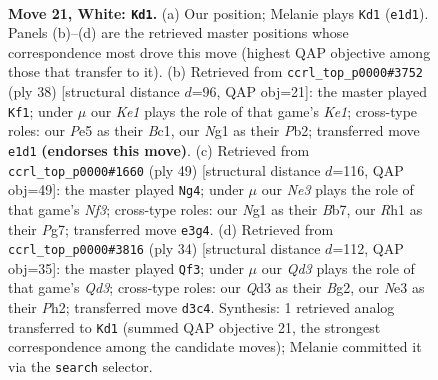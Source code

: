 \documentclass[11pt]{article}
\begin{document}
\clearpage

\begin{figure}[p]\centering
\begin{subfigure}{0.46\textwidth}\centering
\resizebox{\linewidth}{!}{%
\newchessgame
\chessboard[
  setfen={r1b2k2/ppq2pp1/n3p3/3pP3/3n1r2/PP1QN3/6PP/R3K1NR w KQ - 2 21},
  showmover=false,
  pgfstyle=straightmove, color=movearrow, markmove={e1-d1}
]}
\caption{}
\end{subfigure}\hfill
\begin{subfigure}{0.46\textwidth}\centering
\resizebox{\linewidth}{!}{%
\newchessgame
\chessboard[
  setfen={r3kn1r/4p3/p1ppq2p/5p2/P2Q2nP/6N1/1PP2PP1/R1B1K2R w KQkq - 1 20},
  showmover=false,
  pgfstyle=straightmove, color=movearrow, markmove={e1-f1}
]}
\caption{}
\end{subfigure}
\\[4pt]
\begin{subfigure}{0.46\textwidth}\centering
\resizebox{\linewidth}{!}{%
\newchessgame
\chessboard[
  setfen={2k4r/1b4p1/p1p1pn2/1p5p/3qPP2/P1N2BP1/1PQ3P1/4RK2 b - - 1 25},
  showmover=false,
  pgfstyle=straightmove, color=movearrow, markmove={f6-g4}
]}
\caption{}
\end{subfigure}\hfill
\begin{subfigure}{0.46\textwidth}\centering
\resizebox{\linewidth}{!}{%
\newchessgame
\chessboard[
  setfen={r1b3k1/2p3pp/2p2r2/2Np1p1q/p2PnP2/3Q4/PP2PPBP/2R1R1K1 w - - 2 18},
  showmover=false,
  pgfstyle=straightmove, color=movearrow, markmove={d3-f3}
]}
\caption{}
\end{subfigure}
\caption{\textbf{Move 21, White: \texttt{Kd1}.} (a) Our position; Melanie plays \texttt{Kd1} (\texttt{e1d1}). Panels (b)--(d) are the retrieved master positions whose correspondence most drove this move (highest QAP objective among those that transfer to it). (b) Retrieved from \texttt{ccrl\_top\_p0000\#3752} (ply 38) [structural distance $d$=96, QAP obj=21]: the master played \texttt{Kf1}; under $\mu$ our \emph{Ke1} plays the role of that game's \emph{Ke1}; cross-type roles: our \emph{P}e5 as their \emph{B}c1, our \emph{N}g1 as their \emph{P}b2; transferred move \texttt{e1d1} \textbf{(endorses this move)}. (c) Retrieved from \texttt{ccrl\_top\_p0000\#1660} (ply 49) [structural distance $d$=116, QAP obj=49]: the master played \texttt{Ng4}; under $\mu$ our \emph{Ne3} plays the role of that game's \emph{Nf3}; cross-type roles: our \emph{N}g1 as their \emph{B}b7, our \emph{R}h1 as their \emph{P}g7; transferred move \texttt{e3g4}. (d) Retrieved from \texttt{ccrl\_top\_p0000\#3816} (ply 34) [structural distance $d$=112, QAP obj=35]: the master played \texttt{Qf3}; under $\mu$ our \emph{Qd3} plays the role of that game's \emph{Qd3}; cross-type roles: our \emph{Q}d3 as their \emph{B}g2, our \emph{N}e3 as their \emph{P}h2; transferred move \texttt{d3c4}. Synthesis: 1 retrieved analog transferred to \texttt{Kd1} (summed QAP objective 21, the strongest correspondence among the candidate moves); Melanie committed it via the \texttt{search} selector.}
\label{fig:thought-m40}
\end{figure}
\end{document}
